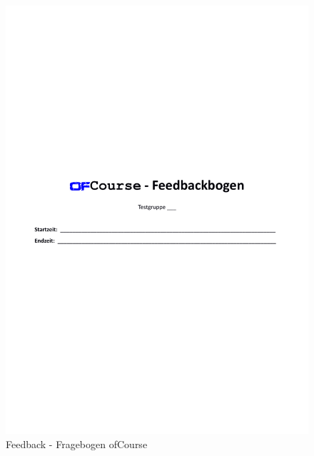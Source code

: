 \begin{figure}
	\centering
	\includegraphics[width=0.9\linewidth, page=2]{pdf/OfCourseFeedback}
	\caption{Feedback - Fragebogen ofCourse}
\end{figure}
